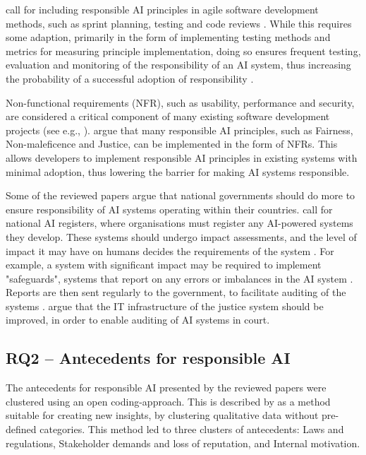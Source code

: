 \textcite[p.~104]{Lu_2022} call for including responsible AI principles in agile software development methods, such as sprint planning, testing and code reviews \parencite{Dybå_2008_agile}. While this requires some adaption, primarily in the form of implementing testing methods and metrics for measuring principle implementation, doing so ensures frequent testing, evaluation and monitoring of the responsibility of an AI system, thus increasing the probability of a successful adoption of responsibility \parencite{Jobin_2019,Rakova_2021,Nauck_2019}.

Non-functional requirements (NFR), such as usability, performance and security, are considered a critical component of many existing software development projects (see e.g., \cite{Chung_2009_NFR,Glinz_2007_NFR,Khatter_2013_NFR}). \textcite{Lu_2022} argue that many responsible AI principles, such as Fairness, Non-maleficence and Justice, can be implemented in the form of NFRs. This allows developers to implement responsible AI principles in existing systems with minimal adoption, thus lowering the barrier for making AI systems responsible.

Some of the reviewed papers argue that national governments should do more to ensure responsibility of AI systems operating within their countries. \textcite{Chen_2020,Brand_2022} call for national AI registers, where organisations must register any AI-powered systems they develop. These systems should undergo impact assessments, and the level of impact it may have on humans decides the requirements of the system \parencite{Brand_2022}. For example, a system with significant impact may be required to implement "safeguards", systems that report on any errors or imbalances in the AI system \parencite{Chen_2020}. Reports are then sent regularly to the government, to facilitate auditing of the systems \parencite{Brand_2022,Chen_2020}. \textcite{Floridi_2018} argue that the IT infrastructure of the justice system should be improved, in order to enable auditing of AI systems in court.



\subsection{RQ2 -- Antecedents for responsible AI}
\label{sec:results-rq2:antecedents}
The antecedents for responsible AI  presented by the reviewed papers were clustered using an open coding-approach. This is described by \textcite{Corbin_1990_opencoding} as a method suitable for creating new insights, by clustering qualitative data without pre-defined categories. This method led to three clusters of antecedents: Laws and regulations, Stakeholder demands and loss of reputation, and Internal motivation.

